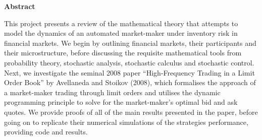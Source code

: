 \thispagestyle{plain}
\mbox{}
\vspace{60mm}
\begin{center}
    \textbf{Abstract}
\end{center}
This project presents a review of the mathematical theory that attempts to model the 
dynamics of an automated market-maker under inventory risk in financial markets. We 
begin by outlining financial markets, their participants and their microstructure, 
before discussing the requisite mathematical tools from probability theory, stochastic 
analysis, stochastic calculus and stochastic control. Next, we investigate the seminal 
2008 paper ``High-Frequency Trading in a Limit Order Book'' by Avellaneda and Stoikov 
(2008), which formalises the approach of a market-maker trading through limit orders 
and utilises the dynamic programming principle to solve for the market-maker's optimal 
bid and ask quotes. We provide proofs of all of the main results presented in the paper,
before going on to replicate their numerical simulations of the strategies performance,
providing code and results. 
\newpage
